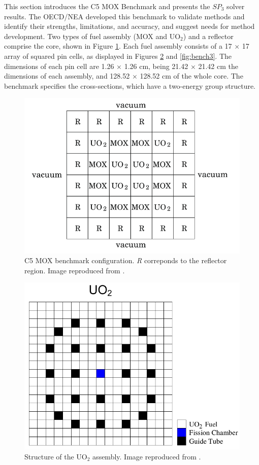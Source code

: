 \documentclass{anstrans}
\begin{document}
This section introduces the C5 MOX Benchmark \cite{cavarec_benchmark_1994} and presents the $SP_3$ solver results.
The \gls{OECD}/\gls{NEA} developed this benchmark to validate methods and identify their strengths, limitations, and accuracy, and suggest needs for method development.
Two types of fuel assembly (MOX and UO$_2$) and a reflector comprise the core, shown in Figure \ref{fig:bench1}.
Each fuel assembly consists of a 17 $\times$ 17 array of squared pin cells, as displayed in Figures \ref{fig:bench2} and \ref{fig:bench3}.
The dimensions of each pin cell are 1.26 $\times$ 1.26 cm, being 21.42 $\times$ 21.42 cm the dimensions of each assembly, and 128.52 $\times$ 128.52 cm of the whole core.
The benchmark \cite{cavarec_benchmark_1994} specifies the cross-sections, which have a two-energy group structure.

\begin{figure}[htbp!] %
    \centering
    \includegraphics[width=0.85\linewidth]{figures/bench-config.png}
    \hfill
    \caption{C5 MOX benchmark configuration. \textit{R} correponds to the reflector region. Image reproduced from \cite{capilla_applications_2009}.}
    \label{fig:bench1}
\end{figure}

\begin{figure}[htbp!] %
    \centering
    \includegraphics[trim=0 0 0 2.1cm, clip=true, width=0.85\linewidth]{figures/bench-config2.png}
    \hfill
    \caption{Structure of the UO$_2$ assembly. Image reproduced from \cite{capilla_applications_2009}.}
    \label{fig:bench2}
\end{figure}
\end{document}
